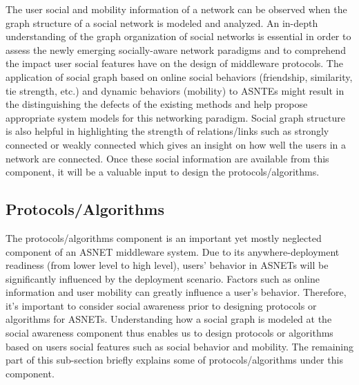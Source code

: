 The user social and mobility information of a network can be observed when the graph structure of a social network is modeled and analyzed. An in-depth understanding of the graph organization of social networks is essential in order to assess the newly emerging socially-aware network paradigms and to comprehend the impact user social features have on the design of middleware protocols. The application of social graph based on online social behaviors (friendship, similarity, tie strength, etc.) and dynamic behaviors (mobility) to ASNTEs might result in the distinguishing the defects of the existing methods and help propose appropriate system models for this networking paradigm. Social graph structure is also helpful in highlighting the strength of relations/links such as strongly connected or weakly connected which gives an insight on how well the users in a network are connected. Once these social information are available from this component, it will be a valuable input to design the protocols/algorithms.

\subsection{Protocols/Algorithms}\label{Chap3_02_04}
The protocols/algorithms component is an important yet mostly neglected component of an ASNET middleware system. Due to its anywhere-deployment readiness (from lower level to high level), users' behavior in ASNETs will be significantly influenced by the deployment scenario. Factors such as online information and user mobility can greatly influence a user's behavior. Therefore, it's important to consider social awareness prior to designing protocols or algorithms for ASNETs. Understanding how a social graph is modeled at the social awareness component thus enables us to design protocols or algorithms based on users social features such as social behavior and mobility. The remaining part of this sub-section briefly explains some of protocols/algorithms under this component.

